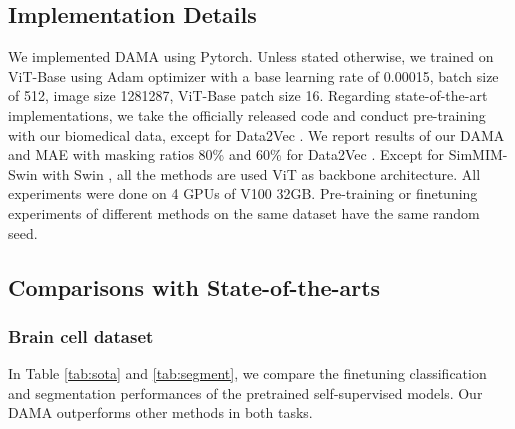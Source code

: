 \documentclass[10pt,twocolumn,letterpaper]{article}
\begin{document}
\subsection{Implementation Details}
We implemented DAMA using Pytorch. Unless stated otherwise, we trained on ViT-Base using Adam optimizer \cite{adam} with a base learning rate of 0.00015, batch size of 512, image size 1281287, ViT-Base patch size 16. Regarding state-of-the-art implementations, we take the officially released code \cite{mocov3,mae,deit} and conduct pre-training with our biomedical data, except for Data2Vec \cite{data2vec}.
We report results of our DAMA and MAE \cite{mae} with masking ratios 80\% and 60\% for Data2Vec \cite{data2vec}. Except for SimMIM-Swin with Swin \cite{swin}, all the methods are used ViT \cite{vit} as backbone architecture. All experiments were done on 4 GPUs of V100 32GB. Pre-training or finetuning experiments of different methods on the same dataset have the same random seed.

\subsection{Comparisons with State-of-the-arts}
\subsubsection{Brain cell dataset} In Table \ref{tab:sota} and \ref{tab:segment}, we compare the finetuning classification and segmentation performances of the pretrained self-supervised models. Our DAMA outperforms other methods in both tasks.
\end{document}
